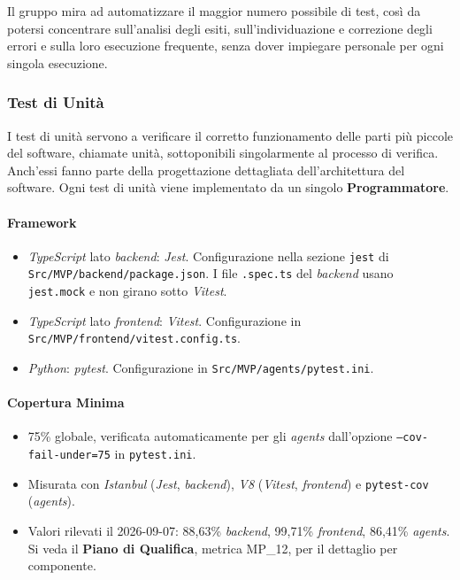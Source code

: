 \documentclass[12pt, a4paper]{article}
\begin{document}
Il gruppo mira ad automatizzare il maggior numero possibile di test, così da potersi concentrare sull'analisi degli esiti, sull'individuazione e correzione degli errori e sulla loro esecuzione frequente, senza dover impiegare personale per ogni singola esecuzione.

\subsubsection{Test di Unità}

I test di unità servono a verificare il corretto funzionamento delle parti più piccole del software, chiamate unità, sottoponibili singolarmente al processo di verifica. Anch'essi fanno parte della progettazione dettagliata dell'architettura del software. Ogni test di unità viene implementato da un singolo \textbf{Programmatore}.

\paragraph{Framework}
\begin{itemize}
    \item \textit{TypeScript} lato \textit{backend}: \textit{Jest}. Configurazione nella sezione \texttt{jest} di \texttt{Src/MVP/backend/package.json}. I file \texttt{.spec.ts} del \textit{backend} usano \texttt{jest.mock} e non girano sotto \textit{Vitest}.
    \item \textit{TypeScript} lato \textit{frontend}: \textit{Vitest}. Configurazione in \texttt{Src/MVP/frontend/vitest.config.ts}.
    \item \textit{Python}: \textit{pytest}. Configurazione in \texttt{Src/MVP/agents/pytest.ini}.
\end{itemize}

\paragraph{Copertura Minima}
\begin{itemize}
    \item 75\% globale, verificata automaticamente per gli \textit{agents} dall'opzione \texttt{--cov-fail-under=75} in \texttt{pytest.ini}.
    \item Misurata con \textit{Istanbul} (\textit{Jest}, \textit{backend}), \textit{V8} (\textit{Vitest}, \textit{frontend}) e \texttt{pytest-cov} (\textit{agents}).
    \item Valori rilevati il 2026-09-07: 88,63\% \textit{backend}, 99,71\% \textit{frontend}, 86,41\% \textit{agents}. Si veda il \textbf{Piano di Qualifica}, metrica MP\_12, per il dettaglio per componente.
\end{itemize}
\end{document}
